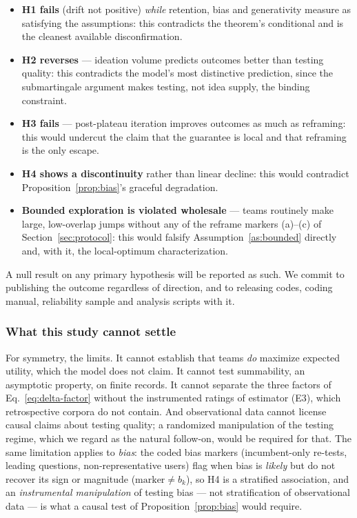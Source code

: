 \documentclass[11pt]{article}
\begin{document}
\begin{itemize}[leftmargin=1.6em, itemsep=2pt]
\item \textbf{H1 fails} (drift not positive) \emph{while} retention, bias and generativity measure as satisfying the assumptions: this contradicts the theorem's conditional and is the cleanest available disconfirmation.
\item \textbf{H2 reverses} --- ideation volume predicts outcomes better than testing quality: this contradicts the model's most distinctive prediction, since the submartingale argument makes testing, not idea supply, the binding constraint.
\item \textbf{H3 fails} --- post-plateau iteration improves outcomes as much as reframing: this would undercut the claim that the guarantee is local and that reframing is the only escape.
\item \textbf{H4 shows a discontinuity} rather than linear decline: this would contradict Proposition~\ref{prop:bias}'s graceful degradation.
\item \textbf{Bounded exploration is violated wholesale} --- teams routinely make large, low-overlap jumps without any of the reframe markers (a)--(c) of Section~\ref{sec:protocol}: this would falsify Assumption~\ref{as:bounded} directly and, with it, the local-optimum characterization.
\end{itemize}

\noindent A null result on any primary hypothesis will be reported as such. We commit to publishing the outcome regardless of direction, and to releasing codes, coding manual, reliability sample and analysis scripts with it.

\subsubsection*{What this study cannot settle}\label{sec:cannot-settle}

For symmetry, the limits. It cannot establish that teams \emph{do} maximize expected utility, which the model does not claim. It cannot test summability, an asymptotic property, on finite records. It cannot separate the three factors of Eq.~\eqref{eq:delta-factor} without the instrumented ratings of estimator (E3), which retrospective corpora do not contain. And observational data cannot license causal claims about testing quality; a randomized manipulation of the testing regime, which we regard as the natural follow-on, would be required for that. The same limitation applies to \emph{bias}: the coded bias markers (incumbent-only re-tests, leading questions, non-representative users) flag when bias is \emph{likely} but do not recover its sign or magnitude ($\text{marker}\neq b_k$), so H4 is a stratified association, and an \emph{instrumental manipulation} of testing bias --- not stratification of observational data --- is what a causal test of Proposition~\ref{prop:bias} would require.
\end{document}
